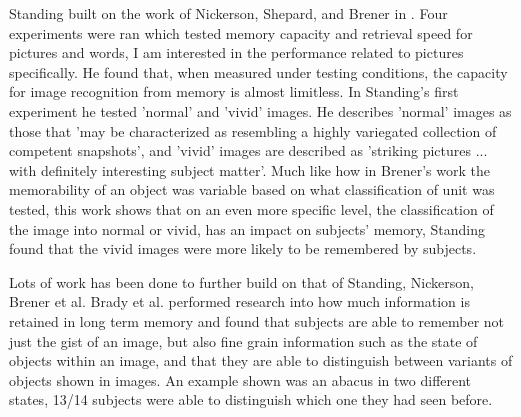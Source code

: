 \documentclass{UoYCSproject}
\begin{document}
Standing built on the work of Nickerson, Shepard, and Brener in \cite{standing10000pictures}. Four experiments were ran which tested memory capacity and retrieval speed for pictures and words, I am interested in the performance related to pictures specifically. He found that, when measured under testing conditions, the capacity for image recognition from memory is almost limitless. In Standing's first experiment he tested 'normal' and 'vivid' images. He describes 'normal' images as those that 'may be characterized as resembling a highly variegated collection of competent snapshots'\cite[p.208]{standing10000pictures}, and 'vivid' images are described as 'striking pictures ... with definitely interesting subject matter'\cite[p.208]{standing10000pictures}. Much like how in Brener's work \cite{BrenerMemorySpan} the memorability of an object was variable based on what classification of unit was tested, this work shows that on an even more specific level, the classification of the image into normal or vivid, has an impact on subjects' memory, Standing found that the vivid images were more likely to be remembered by subjects.



Lots of work has been done to further build on that of Standing, Nickerson, Brener et al. Brady et al. \cite{brady2008visual} performed research into how much information is retained in long term memory and found that subjects are able to remember not just the gist of an image, but also fine grain information such as the state of objects within an image, and that they are able to distinguish between variants of objects shown in images. An example shown was an abacus in two different states, 13/14 subjects were able to distinguish which one they had seen before.
\end{document}
